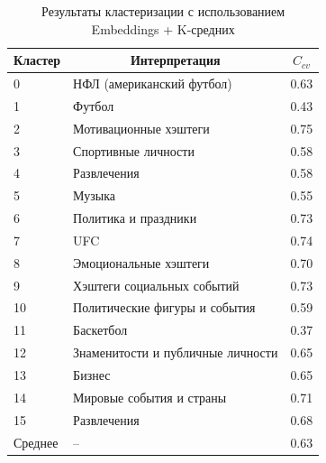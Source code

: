 \documentclass[14pt,a4paper]{article}
\begin{document}
\begin{table}[H]
\centering
\vspace{-1em}
\captionsetup{justification=raggedright, singlelinecheck=false}
\caption{Результаты кластеризации с использованием Embeddings + K-средних}
\begin{tabular}{|l|l|l|}
\hline
\multicolumn{1}{|c|}{\textbf{Кластер}} & \multicolumn{1}{c|}{\textbf{Интерпретация}} & \multicolumn{1}{c|}{\textbf{$C_{cv}$}} \\ \hline
0  & НФЛ (американский футбол)                 & 0.63 \\ \hline
1  & Футбол                                   & 0.43 \\ \hline
2  & Мотивационные хэштеги                    & 0.75 \\ \hline
3  & Спортивные личности                      & 0.58 \\ \hline
4  & Развлечения                              & 0.58 \\ \hline
5  & Музыка                                   & 0.55 \\ \hline
6  & Политика и праздники                     & 0.73 \\ \hline
7  & UFC                                      & 0.74 \\ \hline
8  & Эмоциональные хэштеги                   & 0.70 \\ \hline
9  & Хэштеги социальных событий              & 0.73 \\ \hline
10 & Политические фигуры и события           & 0.59 \\ \hline
11 & Баскетбол                                & 0.37 \\ \hline
12 & Знаменитости и публичные личности       & 0.65 \\ \hline
13 & Бизнес                                   & 0.65 \\ \hline
14 & Мировые события и страны                & 0.71 \\ \hline
15 & Развлечения                              & 0.68 \\ \hline
Среднее & –                                   & 0.63 \\ \hline
\end{tabular}

\label{tab:KmeansClusters}
\end{table}

\end{document}
